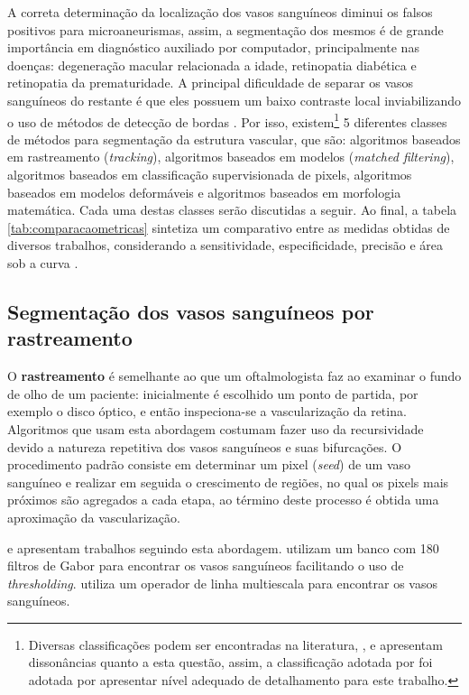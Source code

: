 A correta determinação da localização dos vasos sanguíneos diminui os falsos positivos para microaneurismas, assim, a segmentação dos mesmos é de grande importância em diagnóstico auxiliado por computador, principalmente nas doenças: degeneração macular relacionada a idade, retinopatia diabética e retinopatia da prematuridade. A principal dificuldade de separar os vasos sanguíneos do restante é que eles possuem um baixo contraste local inviabilizando o uso de métodos de detecção de bordas  \cite{Chaudhuri1989, MartinezPerez2007}. Por isso, existem\footnote{Diversas classificações podem ser encontradas na literatura,      ,  e  apresentam dissonâncias quanto a esta questão, assim,  a classificação adotada por  foi adotada por apresentar nível adequado de detalhamento para este trabalho.} 5 diferentes classes de métodos para segmentação da estrutura vascular, que são: algoritmos baseados em rastreamento (\textit{tracking}), algoritmos baseados em modelos (\textit{matched filtering}), algoritmos baseados em classificação supervisionada de pixels, algoritmos baseados em modelos deformáveis e algoritmos baseados em morfologia matemática.  Cada uma destas classes serão discutidas a seguir. Ao final, a tabela \ref{tab:comparacaometricas} sintetiza um comparativo entre as medidas obtidas de diversos trabalhos, considerando a sensitividade, especificidade, precisão e área  sob a curva . 




\subsection{Segmentação dos vasos sanguíneos por rastreamento}

O \textbf{rastreamento} é semelhante ao que um oftalmologista faz ao examinar o fundo de olho de um paciente:  inicialmente é escolhido um ponto de partida, por exemplo o disco óptico, e então inspeciona-se a vascularização da retina. Algoritmos que usam esta abordagem costumam fazer uso da recursividade devido a natureza repetitiva dos vasos sanguíneos e suas bifurcações. O procedimento padrão consiste em determinar um pixel (\textit{seed}) de um vaso sanguíneo e realizar em seguida o crescimento de regiões, no qual os pixels mais próximos são agregados a cada etapa, ao término deste processo é  obtida uma aproximação da vascularização. 

 e  apresentam trabalhos seguindo esta abordagem.  utilizam um banco com 180 filtros de Gabor para encontrar os vasos sanguíneos facilitando o uso de \textit{thresholding}.  utiliza um operador de linha multiescala para encontrar os vasos sanguíneos. 

